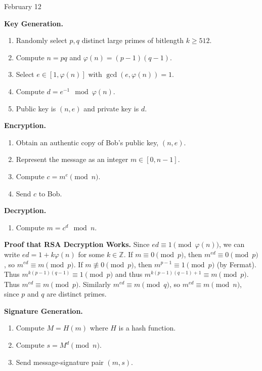 \documentclass[a4paper,12pt]{article}
\begin{document}
\clearpage
{} \hfill February 12

{\bf Key Generation.}
\begin{enumerate}
\item Randomly select $p,q$ distinct large primes of bitlength $k \ge 512$.
\item Compute $n = pq$ and $\varphi(n) = (p-1)(q-1)$.
\item Select $e \in [1,\varphi(n)]$ with $\gcd(e,\varphi(n))=1$.
\item Compute $d = e^{-1} \mod \varphi(n)$.
\item Public key is $(n,e)$ and private key is $d$.
\end{enumerate}

{\bf Encryption.}
\begin{enumerate}
\item Obtain an authentic copy of Bob's public key, $(n,e)$.
\item Represent the message as an integer $m \in [0,n-1]$.
\item Compute $c = m^e \pmod n$.
\item Send $c$ to Bob.
\end{enumerate}

{\bf Decryption.}
\begin{enumerate}
\item Compute $m = c^d \mod n$.
\end{enumerate}

{\bf Proof that RSA Decryption Works.}
Since $ed \equiv 1 \pmod{\varphi(n)}$, we can write $ed = 1+k\varphi(n)$ for some $k \in \mathbb{Z}$. If $m \equiv 0 \pmod{p}$, then $m^{ed} \equiv 0 \pmod{p}$, so $m^{ed} \equiv m \pmod{p}$. If $m \not\equiv 0 \pmod{p}$, then $m^{p-1} \equiv 1 \pmod{p}$ (by Fermat). Thus $m^{k(p-1)(q-1)} \equiv 1 \pmod{p}$ and thus $m^{k(p-1)(q-1)+1} \equiv m \pmod{p}$. Thus $m^{ed} \equiv m \pmod{p}$. Similarly $m^{ed} \equiv m \pmod{q}$, so $m^{ed} \equiv m \pmod{n}$, since $p$ and $q$ are distinct primes.

\vspace{1cm}


{\bf Signature Generation.}
\begin{enumerate}
\item Compute $M=H(m)$ where $H$ is a hash function.
\item Compute $s=M^d \pmod n$.
\item Send message-signature pair $(m,s)$.
\end{enumerate}
\end{document}
